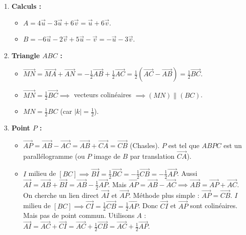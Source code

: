 \documentclass[11pt]{article}
\begin{document}
\begin{corrige}[Exercice n°1]
\begin{enumerate}
\item \textbf{Calculs :}
      \begin{itemize}
      \item $A = 4\vec{u} - 3\vec{u} + 6\vec{v} = \vec{u} + 6\vec{v}$.
      \item $B = -6\vec{u} - 2\vec{v} + 5\vec{u} - \vec{v} = -\vec{u} - 3\vec{v}$.
      \end{itemize}
\item \textbf{Triangle $ABC$ :}
      \begin{itemize}
      \item $\overrightarrow{MN} = \overrightarrow{MA} + \overrightarrow{AN} = -\frac{1}{2}\overrightarrow{AB} + \frac{1}{2}\overrightarrow{AC} = \frac{1}{2}(\overrightarrow{AC} - \overrightarrow{AB}) = \frac{1}{2}\overrightarrow{BC}$.
      \item $\overrightarrow{MN} = \frac{1}{2}\overrightarrow{BC} \implies$ vecteurs colinéaires $\implies (MN) \parallel (BC)$.
      \item $MN = \frac{1}{2} BC$ (car $|k| = \frac{1}{2}$).
      \end{itemize}
\item \textbf{Point $P$ :}
      \begin{itemize}
      \item $\overrightarrow{AP} = \overrightarrow{AB} - \overrightarrow{AC} = \overrightarrow{AB} + \overrightarrow{CA} = \overrightarrow{CB}$ (Chasles). $P$ est tel que $ABPC$ est un parallélogramme (ou $P$ image de $B$ par translation $\overrightarrow{CA}$).
      \item $I$ milieu de $[BC] \implies \overrightarrow{BI} = \frac{1}{2}\overrightarrow{BC} = -\frac{1}{2}\overrightarrow{CB} = -\frac{1}{2}\overrightarrow{AP}$.
        Aussi $\overrightarrow{AI} = \overrightarrow{AB} + \overrightarrow{BI} = \overrightarrow{AB} - \frac{1}{2}\overrightarrow{AP}$.
        Mais $\overrightarrow{AP} = \overrightarrow{AB} - \overrightarrow{AC} \implies \overrightarrow{AB} = \overrightarrow{AP} + \overrightarrow{AC}$.
        On cherche un lien direct $\overrightarrow{AI}$ et $\overrightarrow{AP}$.
        Méthode plus simple : $\overrightarrow{AP} = \overrightarrow{CB}$. $I$ milieu de $[BC] \implies \overrightarrow{CI} = \frac{1}{2}\overrightarrow{CB} = \frac{1}{2}\overrightarrow{AP}$.
        Donc $\overrightarrow{CI}$ et $\overrightarrow{AP}$ sont colinéaires. Mais pas de point commun.
        Utilisons $A$ : $\overrightarrow{AI} = \overrightarrow{AC} + \overrightarrow{CI} = \overrightarrow{AC} + \frac{1}{2}\overrightarrow{CB} = \overrightarrow{AC} + \frac{1}{2}\overrightarrow{AP}$.

\end{itemize}
\end{enumerate}
\end{corrige}
\end{document}
